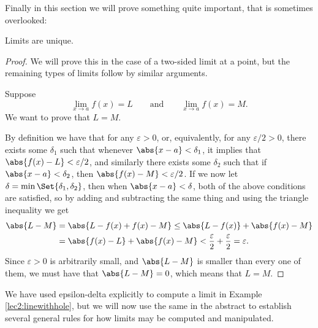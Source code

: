 \noindent
Finally in this section we will prove something quite important, that is sometimes overlooked:

\begin{theorem}
	Limits are unique.
\end{theorem}

\begin{proof}
	We will prove this in the case of a two-sided limit at a point, but the remaining types of limits follow by similar arguments.

	Suppose
	\[
		\lim_{x \to a} f(x) = L \qquad \text{and} \qquad \lim_{x \to a} f(x) = M.
	\]
	We want to prove that $L = M$.

	By definition we have that for any $\varepsilon > 0$, or, equivalently, for any $\varepsilon / 2 > 0$, there exists some $\delta_1$ such that whenever $\abs{x - a} < \delta_1$, it implies that $\abs{f(x) - L} < \varepsilon / 2$, and similarly there exists some $\delta_2$ such that if $\abs{x - a} < \delta_2$, then $\abs{f(x) - M} < \varepsilon / 2$. If we now let $\delta = \min\Set{\delta_1, \delta_2}$, then when $\abs{x - a} < \delta$, both of the above conditions are satisfied, so by adding and subtracting the same thing and using the triangle inequality we get
	\begin{align*}
		\abs{L - M} & = \abs{L - f(x) + f(x) - M} \leq \abs{L - f(x)} + \abs{f(x) - M}                                 \\
		            & = \abs{f(x) - L} + \abs{f(x) - M} < \frac{\varepsilon}{2} + \frac{\varepsilon}{2} = \varepsilon.
	\end{align*}
	Since $\varepsilon > 0$ is arbitrarily small, and $\abs{L - M}$ is smaller than every one of them, we must have that $\abs{L - M} = 0$, which means that $L = M$.
\end{proof}


We have used epsilon-delta explicitly to compute a limit in Example \ref{lec2:linewithhole}, but we will now use the same in the abstract to establish several general rules for how limits may be computed and manipulated.


